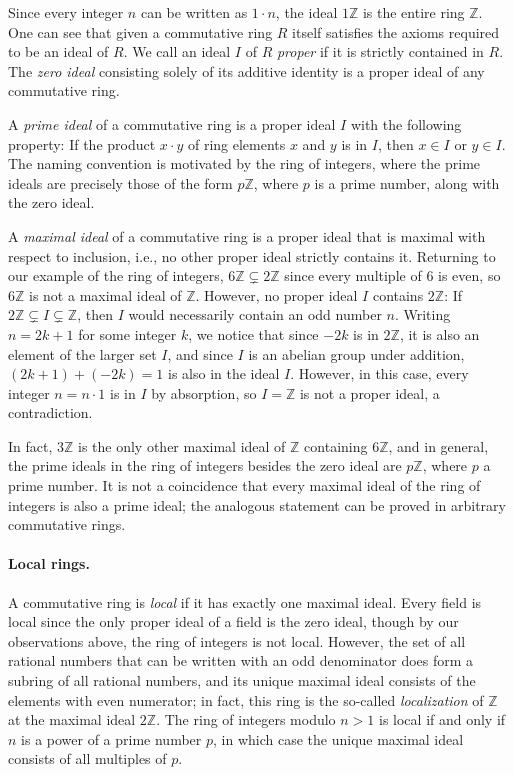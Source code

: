\documentclass{article}
\begin{document}
Since every integer $n$ can be written as $1 \cdot n$, the ideal $1 \mathbb{Z}$
is the entire ring $\mathbb{Z}$. One can see that given a commutative ring
$R$ itself satisfies the axioms required to be an ideal of $R$. We call an
ideal $I$ of $R$ \emph{proper} if it is strictly contained in $R$. The
\emph{zero ideal} consisting solely of its additive identity is a proper ideal
of any commutative ring. 

A \emph{prime ideal} of a commutative ring is a proper ideal $I$ with the
following property:   If the product $x \cdot y$ of ring elements $x$ and $y$
is in $I$, then $x \in I$ or $y \in I$. The naming convention is motivated by
the ring of integers, where the prime ideals are precisely those  of the form
$p\mathbb{Z}$, where $p$ is a prime number, along with the zero ideal. 

A \emph{maximal ideal} of a commutative ring is a proper ideal that is maximal
with respect to inclusion, i.e., no other proper ideal strictly contains it. 
Returning to our example of the ring of integers,
$6 \mathbb{Z} \subsetneq 2 \mathbb{Z}$ since every multiple of $6$ is even, so
$6 \mathbb{Z}$ is not a maximal ideal of $\mathbb{Z}$. However, no proper ideal
$I$ contains $2 \mathbb{Z}$: If $2\mathbb{Z}\subsetneq I\subsetneq \mathbb{Z}$,
then $I$  would necessarily contain an odd number $n$. Writing $n=2k+1$ for
some integer $k$, we notice that since $-2k$ is in $2\mathbb{Z}$, it is also an
element of the larger set $I$, and since $I$ is an abelian group under
addition, $(2k+1) + (-2k) = 1$ is also in the ideal $I$. However, in this case,
every integer $n = n \cdot 1$ is in $I$ by absorption, so $I = \mathbb{Z}$ is
not a proper ideal, a contradiction. 

In fact, $3 \mathbb{Z}$ is the only other maximal ideal of $\mathbb{Z}$
containing $6 \mathbb{Z}$, and in general, the prime ideals in the ring of
integers besides the zero ideal are  $p \mathbb{Z}$, where $p$ a prime number. 
It is not a coincidence that every maximal ideal of the ring of integers is
also a prime  ideal; the analogous statement can be proved in arbitrary
commutative rings.

\paragraph{Local rings.}
A commutative ring is \emph{local} if it has exactly one maximal ideal. 
Every field is local since the only proper ideal of a field is the zero ideal,
though by our observations above, the ring of integers is not local. 
However, the set of all rational numbers that can be written with an odd
denominator does form a subring of all rational numbers, and its unique maximal
ideal consists of the elements with even numerator; in fact, this ring is the
so-called \emph{localization} of $\mathbb{Z}$ at the maximal ideal
$2\mathbb{Z}$. The ring of integers modulo $n>1$ is local if and only if $n$ is
a power of a prime number $p$, in which case the unique maximal ideal consists
of all multiples of $p$. 
\end{document}
